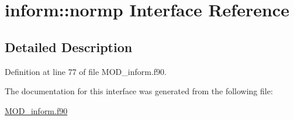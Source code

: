 \hypertarget{interfaceinform_1_1normp}{\section{inform\-:\-:normp Interface Reference}
\label{interfaceinform_1_1normp}
}


\subsection{Detailed Description}


Definition at line 77 of file M\-O\-D\-\_\-inform.\-f90.



The documentation for this interface was generated from the following file\-:\begin{DoxyCompactItemize}
\item 
\hyperlink{MOD__inform_8f90}{M\-O\-D\-\_\-inform.\-f90}\end{DoxyCompactItemize}
